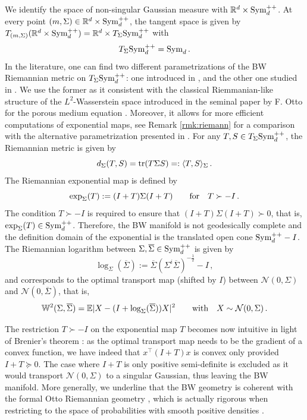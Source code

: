 \documentclass{article}
\theoremstyle{plain}
\theoremstyle{definition}
\theoremstyle{remark}
\newcommand{\Rd}{ {\mathbb{R}^d}}
\newcommand{\sym}{\textup{Sym}_d}
\newcommand{\pd}{\textup{Sym}^{++}_d}
\newcommand{\tr}{\textup{tr}}
\newcommand{\W}{\mathbb{W}}
\begin{document}
We identify the space of non-singular Gaussian measure with $\Rd \times \pd$. At every point $(m, \Sigma)\in \Rd \times \pd$, the tangent space is given by $T_{(m, \Sigma)}(\Rd \times \pd) = \Rd \times T_{\Sigma}\pd$ with
\[
T_\Sigma\pd = \sym\,.
\]
In the literature, one can find two different parametrizations of the BW Riemannian metric  on $T_\Sigma\pd$: one introduced in \cite{takatsu2011}, and the other one studied in \cite{Malago2018,bathia2019}. We use the former as it consistent with the classical Riemmanian-like structure of the $L^2$-Wasserstein space introduced in
 the seminal paper by F. Otto for the porous medium equation \cite{otto2001geometry}. Moreover, it allows for more efficient computations of exponential maps, see Remark \ref{rmk:riemann} for a comparison with the alternative parametrization presented in \cite{Malago2018,bathia2019}.
 For any $T, S\in T_{\Sigma}\pd$, the Riemannian metric is given by
\begin{equation} \label{eq:dBW}
d_\Sigma(T,S) = \tr(T\Sigma S) =: \langle T, S\rangle_{\Sigma} \,.
\end{equation}
The Riemannian exponential map  is defined by 
\begin{equation} 
\label{eq:expBW_app}
 \exp_{\Sigma}(T) := (I+ T)\Sigma (I+ T)\qquad \textup{for}\quad T  \succ -I\,.
\end{equation}
 The condition $T \succ -I$ is required to ensure that  $(I + T) \Sigma (I+T)\succ 0$, that is, $\exp_{\Sigma}(T)\in \pd$. Therefore, the BW manifold is not geodesically complete and the definition domain of the exponential is the translated open cone $\pd - I$. 
 The Riemannian logarithm between  $\Sigma,\overline{\Sigma} \in \pd$ is given by  
\begin{equation} \label{eq:logBW}
 \log_{\Sigma}(\overline{\Sigma}):= \overline{\Sigma}(\Sigma^i \overline{\Sigma})^{-\frac12} - I\,,
\end{equation}
and corresponds to the optimal transport map (shifted by $I$) between $\mathcal{N}(0,\Sigma)$ and $\mathcal{N}(0,\overline{\Sigma})$, that is, 
\[
\W^2(\Sigma, \overline{\Sigma}) = \mathbb{E}|X - ( I + \log_{\Sigma}(\overline{\Sigma})) X |^2
\qquad \textup{with}\quad X \sim \mathcal{N}(0, \Sigma)\,.
\]

The restriction $T \succ - I$ on the exponential map $T$ becomes now intuitive in light of Brenier's theorem \cite{brenier1991}: as the optimal transport map needs to be the gradient of a convex function, we have indeed that $x^\top(I + T)x$ is convex only provided $I + T\succeq 0$.  The case where $I + T$ is only positive semi-definite is excluded as it would transport $\mathcal{N}(0, \Sigma)$ to a singular Gaussian, thus leaving the BW manifold.
More generally, we underline that the BW geometry is 
coherent with the formal Otto Riemannian geometry \cite{otto2001geometry}, which  is actually rigorous when restricting to the space of probabilities with smooth positive densities  \cite{lott2008some}. 
\end{document}
